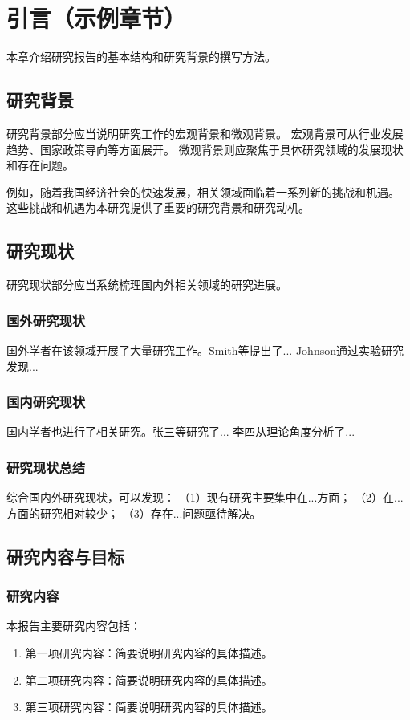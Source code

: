 \chapter{引言（示例章节）}
\label{chap:introduction}

本章介绍研究报告的基本结构和研究背景的撰写方法。

\section{研究背景}
研究背景部分应当说明研究工作的宏观背景和微观背景。
宏观背景可从行业发展趋势、国家政策导向等方面展开。
微观背景则应聚焦于具体研究领域的发展现状和存在问题。

例如，随着我国经济社会的快速发展，相关领域面临着一系列新的挑战和机遇。
这些挑战和机遇为本研究提供了重要的研究背景和研究动机\cite{example2023}。

\section{研究现状}
研究现状部分应当系统梳理国内外相关领域的研究进展。

\subsection{国外研究现状}
国外学者在该领域开展了大量研究工作。Smith等\cite{smith2022}提出了...
Johnson\cite{johnson2021}通过实验研究发现...

\subsection{国内研究现状}
国内学者也进行了相关研究。张三等\cite{zhang2020}研究了...
李四\cite{li2019}从理论角度分析了...

\subsection{研究现状总结}
综合国内外研究现状，可以发现：
（1）现有研究主要集中在...方面；
（2）在...方面的研究相对较少；
（3）存在...问题亟待解决。

\section{研究内容与目标}
\subsection{研究内容}
本报告主要研究内容包括：
\begin{enumerate}
    \item 第一项研究内容：简要说明研究内容的具体描述。
    \item 第二项研究内容：简要说明研究内容的具体描述。
    \item 第三项研究内容：简要说明研究内容的具体描述。
\end{enumerate}

